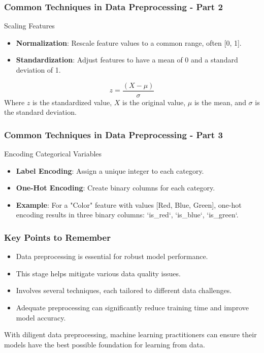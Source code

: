\documentclass[aspectratio=169]{beamer}
\begin{document}
\begin{frame}[fragile]
    \frametitle{Common Techniques in Data Preprocessing - Part 2}
    \begin{block}{Scaling Features}
        \begin{itemize}
            \item \textbf{Normalization}: Rescale feature values to a common range, often [0, 1].
            \item \textbf{Standardization}: Adjust features to have a mean of 0 and a standard deviation of 1.
        \end{itemize}
        \begin{equation}
            z = \frac{(X - \mu)}{\sigma}
        \end{equation}
        Where \(z\) is the standardized value, \(X\) is the original value, \(\mu\) is the mean, and \(\sigma\) is the standard deviation.
    \end{block}
\end{frame}

\begin{frame}[fragile]
    \frametitle{Common Techniques in Data Preprocessing - Part 3}
    \begin{block}{Encoding Categorical Variables}
        \begin{itemize}
            \item \textbf{Label Encoding}: Assign a unique integer to each category.
            \item \textbf{One-Hot Encoding}: Create binary columns for each category.
            \item \textbf{Example}: For a "Color" feature with values [Red, Blue, Green], one-hot encoding results in three binary columns: `is\_red`, `is\_blue`, `is\_green`.
        \end{itemize}
    \end{block}
\end{frame}

\begin{frame}[fragile]
    \frametitle{Key Points to Remember}
    \begin{itemize}
        \item Data preprocessing is essential for robust model performance.
        \item This stage helps mitigate various data quality issues.
        \item Involves several techniques, each tailored to different data challenges.
        \item Adequate preprocessing can significantly reduce training time and improve model accuracy.
    \end{itemize}
    With diligent data preprocessing, machine learning practitioners can ensure their models have the best possible foundation for learning from data.
\end{frame}
\end{document}
